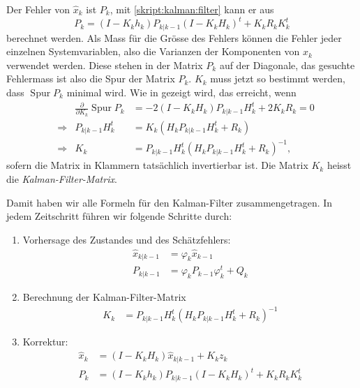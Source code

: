 Der Fehler von $\hat{x}_k$ ist $P_k$, mit \eqref{skript:kalman:filter}
kann er aus
\begin{equation}
P_k
=
(I-K_kh_k)P_{k|k-1}(I-K_kH_k)^t + K_kR_kK_k^t
\label{skript:fehler:korrektur}
\end{equation}
berechnet werden.
Als Mass für die Grösse des Fehlers können die Fehler jeder einzelnen 
Systemvariablen, also die Varianzen der Komponenten von $x_k$ 
verwendet werden.
Diese stehen in der Matrix $P_k$ auf der Diagonale, 
das gesuchte Fehlermass ist also die Spur der Matrix $P_k$.
$K_k$ muss jetzt so bestimmt werden, dass $\operatorname{Spur} P_k$ 
minimal wird.
Wie in \cite{skript:wrstatskript} gezeigt wird, das erreicht, wenn
\[
\begin{aligned}
&&
\frac{\partial}{\partial K_k} \operatorname{Spur}P_k
&=
-2(I-K_kH_k)P_{k|k-1}H_k^t + 2K_kR_k
=
0
\\
&\Rightarrow&
P_{k|k-1}H_k^t
&=
K_k(H_kP_{k|k-1}H_k^t+R_k)
\\
&\Rightarrow&
K_k
&=
P_{k|k-1}H_k^t
(H_kP_{k|k-1}H_k^t+R_k)^{-1},
\end{aligned}
\]
sofern die Matrix in Klammern tatsächlich invertierbar ist.
Die Matrix $K_k$ heisst die {\em Kalman-Filter-Matrix}.
%

Damit haben wir alle Formeln für den Kalman-Filter zusammengetragen.
In jedem Zeitschritt führen wir folgende Schritte durch:
\begin{enumerate}
\item
Vorhersage des Zustandes und des Schätzfehlers:
\begin{align*}
\hat{x}_{k|k-1}&= \varphi_k\hat{x}_{k-1} \\
P_{k|k-1}      &= \varphi_kP_{k-1}\varphi_k^t + Q_k
\end{align*}
\item
Berechnung der Kalman-Filter-Matrix
\begin{align}
K_k
&=
P_{k|k-1}H_k^t
(H_kP_{k|k-1}H_k^t+R_k)^{-1}
\label{kalman:kmatrix}
\end{align}
\item
Korrektur:
\begin{align*}
\hat{x}_k&= (I-K_kH_k)\hat{x}_{k|k-1} + K_kz_k \\
P_k      &= 
(I-K_kh_k)P_{k|k-1}(I-K_kH_k)^t + K_kR_kK_k^t
\end{align*}
\end{enumerate}

